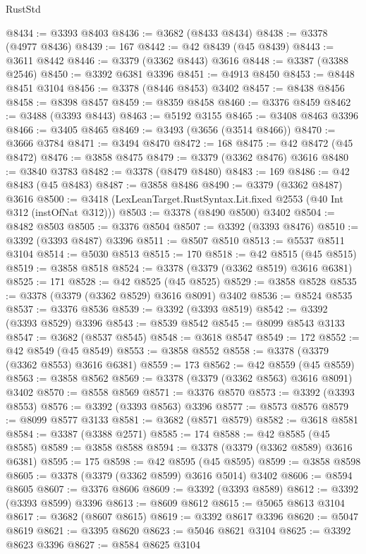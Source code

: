 \begin{lexlean}{RustStd}
\begin{coremodule}
@8434 := @3393 @8403
@8436 := @3682 (@8433 @8434)
@8438 := @3378 (@4977 @8436)
@8439 := 167
@8442 := @42 @8439 (@45 @8439)
@8443 := @3611 @8442
@8446 := @3379 (@3362 @8443) @3616
@8448 := @3387 (@3388 @2546)
@8450 := @3392 @6381 @3396
@8451 := @4913 @8450
@8453 := @8448 @8451 @3104
@8456 := @3378 (@8446 @8453) @3402
@8457 := @8438 @8456
@8458 := @8398 @8457
@8459 := @8359 @8458
@8460 := @3376 @8459
@8462 := @3488 (@3393 @8443)
@8463 := @5192 @3155
@8465 := @3408 @8463 @3396
@8466 := @3405 @8465
@8469 := @3493 (@3656 (@3514 @8466))
@8470 := @3666 @3784
@8471 := @3494 @8470
@8472 := 168
@8475 := @42 @8472 (@45 @8472)
@8476 := @3858 @8475
@8479 := @3379 (@3362 @8476) @3616
@8480 := @3840 @3783
@8482 := @3378 (@8479 @8480)
@8483 := 169
@8486 := @42 @8483 (@45 @8483)
@8487 := @3858 @8486
@8490 := @3379 (@3362 @8487) @3616
@8500 := @3418 (LexLeanTarget.RustSyntax.Lit.fixed @2553 (@40 Int @312 (instOfNat @312)))
@8503 := @3378 (@8490 @8500) @3402
@8504 := @8482 @8503
@8505 := @3376 @8504
@8507 := @3392 (@3393 @8476)
@8510 := @3392 (@3393 @8487) @3396
@8511 := @8507 @8510
@8513 := @5537 @8511 @3104
@8514 := @5030 @8513
@8515 := 170
@8518 := @42 @8515 (@45 @8515)
@8519 := @3858 @8518
@8524 := @3378 (@3379 (@3362 @8519) @3616 @6381)
@8525 := 171
@8528 := @42 @8525 (@45 @8525)
@8529 := @3858 @8528
@8535 := @3378 (@3379 (@3362 @8529) @3616 @8091) @3402
@8536 := @8524 @8535
@8537 := @3376 @8536
@8539 := @3392 (@3393 @8519)
@8542 := @3392 (@3393 @8529) @3396
@8543 := @8539 @8542
@8545 := @8099 @8543 @3133
@8547 := @3682 (@8537 @8545)
@8548 := @3618 @8547
@8549 := 172
@8552 := @42 @8549 (@45 @8549)
@8553 := @3858 @8552
@8558 := @3378 (@3379 (@3362 @8553) @3616 @6381)
@8559 := 173
@8562 := @42 @8559 (@45 @8559)
@8563 := @3858 @8562
@8569 := @3378 (@3379 (@3362 @8563) @3616 @8091) @3402
@8570 := @8558 @8569
@8571 := @3376 @8570
@8573 := @3392 (@3393 @8553)
@8576 := @3392 (@3393 @8563) @3396
@8577 := @8573 @8576
@8579 := @8099 @8577 @3133
@8581 := @3682 (@8571 @8579)
@8582 := @3618 @8581
@8584 := @3387 (@3388 @2571)
@8585 := 174
@8588 := @42 @8585 (@45 @8585)
@8589 := @3858 @8588
@8594 := @3378 (@3379 (@3362 @8589) @3616 @6381)
@8595 := 175
@8598 := @42 @8595 (@45 @8595)
@8599 := @3858 @8598
@8605 := @3378 (@3379 (@3362 @8599) @3616 @5014) @3402
@8606 := @8594 @8605
@8607 := @3376 @8606
@8609 := @3392 (@3393 @8589)
@8612 := @3392 (@3393 @8599) @3396
@8613 := @8609 @8612
@8615 := @5065 @8613 @3104
@8617 := @3682 (@8607 @8615)
@8619 := @3392 @8617 @3396
@8620 := @5047 @8619
@8621 := @3395 @8620
@8623 := @5046 @8621 @3104
@8625 := @3392 @8623 @3396
@8627 := @8584 @8625 @3104

\end{coremodule}
\end{lexlean}
